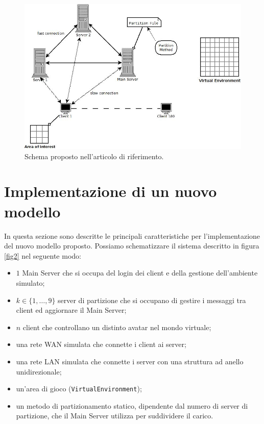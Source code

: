 \documentclass{article}
\begin{document}
\begin{figure}
\label{fig1}
\begin{center}
\includegraphics[scale=0.50]{schema.jpeg}
\end{center}
\caption{Schema proposto nell'articolo di riferimento.}
\end{figure}


\section{Implementazione di un nuovo modello}

In questa sezione sono descritte le principali caratteristiche per 
l'implementazione del nuovo modello proposto. Possiamo schematizzare il
sistema descritto in figura \ref{fig2} nel seguente modo:
\begin{itemize}
\item
$1$ Main Server che si occupa del login dei client e della gestione
dell'ambiente simulato;
\item
$k \in \{1, \ldots, 9\}$ server di partizione che si occupano di gestire i
messaggi tra client ed aggiornare il Main Server;
\item
$n$ client che controllano un distinto avatar nel mondo virtuale;
\item
una rete WAN simulata che connette i client ai server;
\item
una rete LAN simulata che connette i server con una struttura ad anello 
unidirezionale;
\item
un'area di gioco (\texttt{VirtualEnvironment});
\item
un metodo di partizionamento statico, dipendente dal numero di server di
partizione, che il Main Server utilizza per suddividere il carico.
\end{itemize}
\end{document}

